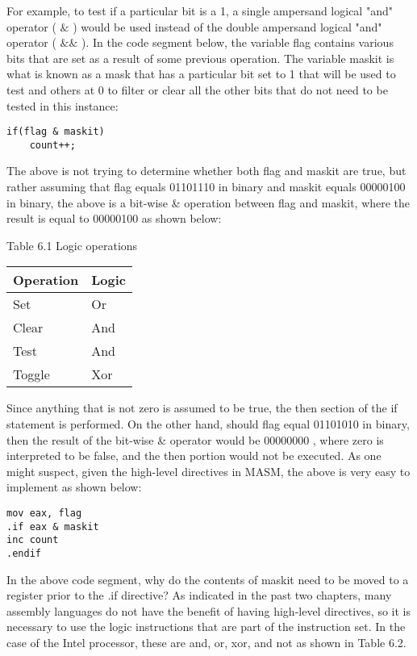 \documentclass[10pt]{article}
\begin{document}
For example, to test if a particular bit is a 1, a single ampersand logical "and" operator ( $\&$ ) would be used instead of the double ampersand logical "and" operator ( $\& \&$ ). In the code segment below, the variable flag contains various bits that are set as a result of some previous operation. The variable maskit is what is known as a mask that has a particular bit set to 1 that will be used to test and others at 0 to filter or clear all the other bits that do not need to be tested in this instance:

\begin{verbatim}
if(flag & maskit)
    count++;
\end{verbatim}

The above is not trying to determine whether both flag and maskit are true, but rather assuming that flag equals 01101110 in binary and maskit equals 00000100 in binary, the above is a bit-wise \& operation between flag and maskit, where the result is equal to 00000100 as shown below:

Table 6.1 Logic operations

\begin{center}
\begin{tabular}{|ll|}
\hline
Operation & Logic \\
\hline
Set & Or \\
Clear & And \\
Test & And \\
Toggle & Xor \\
\hline
\end{tabular}
\end{center}

Since anything that is not zero is assumed to be true, the then section of the if statement is performed. On the other hand, should flag equal 01101010 in binary, then the result of the bit-wise \& operator would be 00000000 , where zero is interpreted to be false, and the then portion would not be executed. As one might suspect, given the high-level directives in MASM, the above is very easy to implement as shown below:

\begin{verbatim}
mov eax, flag
.if eax & maskit
inc count
.endif
\end{verbatim}

In the above code segment, why do the contents of maskit need to be moved to a register prior to the .if directive? As indicated in the past two chapters, many assembly languages do not have the benefit of having high-level directives, so it is necessary to use the logic instructions that are part of the instruction set. In the case of the Intel processor, these are and, or, xor, and not as shown in Table 6.2.
\end{document}
